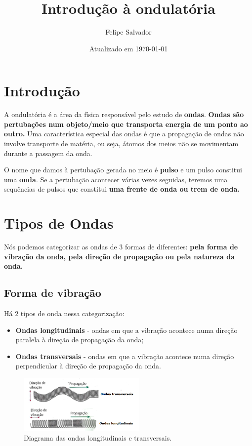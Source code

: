 \documentclass[12pt]{extarticle}
\title{Introdução à ondulatória}
\author{Felipe Salvador}
\date{Atualizado em \today}
\newcommand{\<}{\langle}
\renewcommand{\>}{\rangle}
\theoremstyle{definition}
\begin{document}
\maketitle

\section{Introdução}
A ondulatória é a área da física responsável pelo estudo de \textbf{ondas}. \textbf{Ondas são pertubações num objeto/meio que transporta energia de um ponto ao outro.} Uma característica especial das ondas é que a propagação de ondas não involve transporte de matéria, ou seja, átomos dos meios não se movimentam durante a passagem da onda.

O nome que damos à pertubação gerada no meio é \textbf{pulso} e um pulso constitui uma \textbf{onda}. Se a pertubação acontecer várias vezes seguidas, teremos uma sequências de pulsos que constitui \textbf{uma frente de onda ou trem de onda.}

\section{Tipos de Ondas}
Nós podemos categorizar as ondas de 3 formas de diferentes: \textbf{pela forma de vibração da onda, pela direção de propagação ou pela natureza da onda.}

\subsection{Forma de vibração}
Há 2 tipos de onda nessa categorização:
\begin{itemize}
    \item \textbf{Ondas longitudinais} - ondas em que a vibração acontece numa direção paralela à direção de propagação da onda;
    \item \textbf{Ondas transversais} - ondas em que a vibração acontece numa direção perpendicular à direção de propagação da onda.
\end{itemize}
\begin{figure}[H]
    \centering
    \includegraphics[width=0.55\textwidth]{ondas_longitudinais_transversais.png}
    \caption{Diagrama das ondas longitudinais e transversais.}
    \label{fig:longitudinal_transversal}
\end{figure}
\end{document}
